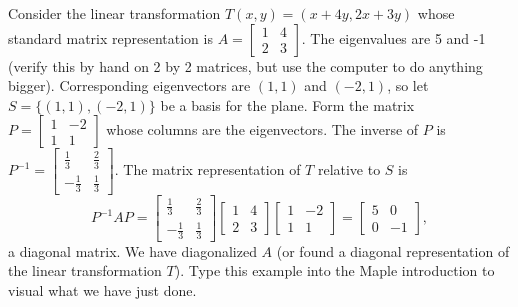 \begin{example}
Consider the linear transformation $T(x,y) = (x+4y,2x+3y)$ whose standard matrix representation is
$A=  
\begin{bmatrix}
 1 & 4 \\
 2 & 3
\end{bmatrix} 
$. The eigenvalues are 5 and -1 (verify this by hand on 2 by 2 matrices, but use the computer to do anything bigger). Corresponding eigenvectors are $(1,1)$ and $(-2,1)$, so let $S=\{(1,1),(-2,1)\}$ be a basis for the plane.  Form the matrix 
$P=
\begin{bmatrix}
 1 & -2 \\
 1 & 1
\end{bmatrix} 
$ whose columns are the eigenvectors. The inverse of $P$ is 
$P^{-1} = 
\begin{bmatrix}
 \frac{1}{3} & \frac{2}{3} \\
 -\frac{1}{3} & \frac{1}{3}
\end{bmatrix} 
$. The matrix representation of $T$ relative to $S$ is 
$$
P^{-1}AP=\begin{bmatrix}
 \frac{1}{3} & \frac{2}{3} \\
 -\frac{1}{3} & \frac{1}{3}
\end{bmatrix} 
 \begin{bmatrix}
 1 & 4 \\
 2 & 3
\end{bmatrix} 
\begin{bmatrix}
 1 & -2 \\
 1 & 1
\end{bmatrix} 
=
\begin{bmatrix}
 5 & 0 \\
 0 & -1
\end{bmatrix} 
,$$ a diagonal matrix.  We have diagonalized $A$ (or found a diagonal representation of the linear transformation $T$). Type this example into the Maple introduction to visual what we have just done.
 
\end{example}


